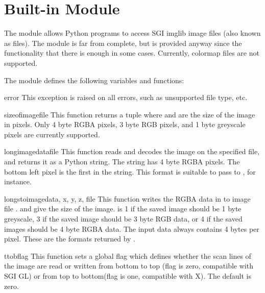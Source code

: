 \section{Built-in Module }
\label{module-rgbimg}

The  module allows Python programs to access SGI imglib image
files (also known as  files).  The module is far from
complete, but is provided anyway since the functionality that there is
enough in some cases.  Currently, colormap files are not supported.

The module defines the following variables and functions:

\begin{excdesc}{error}
This exception is raised on all errors, such as unsupported file type, etc.
\end{excdesc}

\begin{funcdesc}{sizeofimage}{file}
This function returns a tuple  where
 and  are the size of the image in pixels.
Only 4 byte RGBA pixels, 3 byte RGB pixels, and 1 byte greyscale pixels
are currently supported.
\end{funcdesc}

\begin{funcdesc}{longimagedata}{file}
This function reads and decodes the image on the specified file, and
returns it as a Python string. The string has 4 byte RGBA pixels.
The bottom left pixel is the first in
the string. This format is suitable to pass to ,
for instance.
\end{funcdesc}

\begin{funcdesc}{longstoimage}{data, x, y, z, file}
This function writes the RGBA data in  to image
file .  and  give the size of the image.
 is 1 if the saved image should be 1 byte greyscale, 3 if the
saved image should be 3 byte RGB data, or 4 if the saved images should
be 4 byte RGBA data.  The input data always contains 4 bytes per pixel.
These are the formats returned by .
\end{funcdesc}

\begin{funcdesc}{ttob}{flag}
This function sets a global flag which defines whether the scan lines
of the image are read or written from bottom to top (flag is zero,
compatible with SGI GL) or from top to bottom(flag is one,
compatible with X)\@.  The default is zero.
\end{funcdesc}
